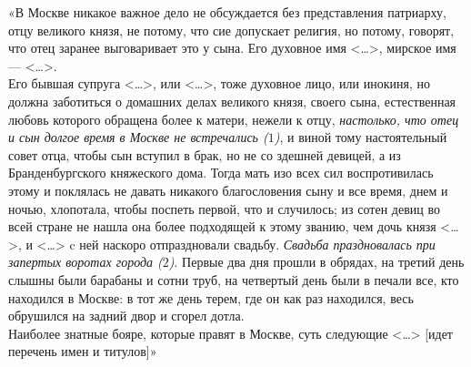     «В Москве никакое важное дело не обсуждается без представления патриарху, отцу великого князя, не потому, что сие допускает религия, но потому, говорят, что отец заранее выговаривает это у сына. Его духовное имя <…>, мирское имя — <…>.
    \\
    Его бывшая супруга <…>, или <…>, тоже духовное лицо, или инокиня, но должна заботиться о домашних делах великого князя, своего сына, естественная любовь которого обращена более к матери, нежели к отцу, \textit{настолько, что отец и сын долгое время в Москве не встречались ($1$)}, и виной тому настоятельный совет отца, чтобы сын вступил в брак, но не со здешней девицей, а из Бранденбургского княжеского дома. Тогда мать изо всех сил воспротивилась этому и поклялась не давать никакого благословения сыну и все время, днем и ночью, хлопотала, чтобы поспеть первой, что и случилось; из сотен девиц во всей стране не нашла она более подходящей к этому званию, чем дочь князя <…>, и <…> c ней наскоро отпраздновали свадьбу. \textit{Свадьба праздновалась при запертых воротах города ($2$)}. Первые два дня прошли в обрядах, на третий день слышны были барабаны и сотни труб, на четвертый день были в печали все, кто находился в Москве: в тот же день терем, где он как раз находился, весь обрушился на задний двор и сгорел дотла.
    \\
    Наиболее знатные бояре, которые правят в Москве, суть следующие <…> [идет перечень имен и титулов]»

